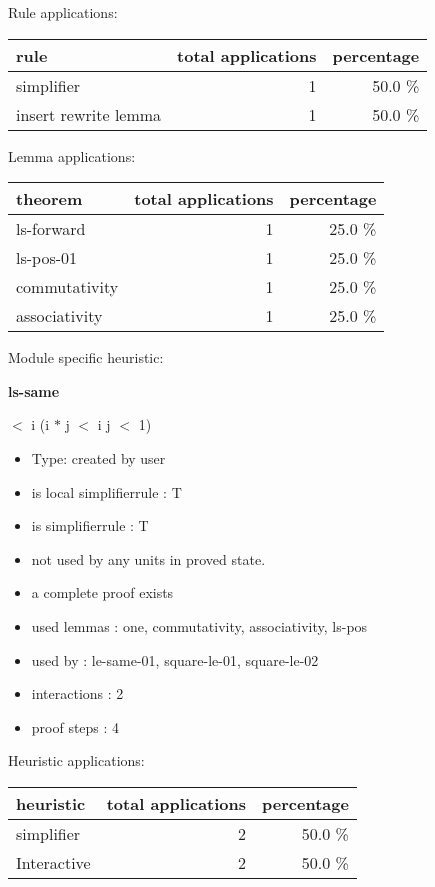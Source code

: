 \documentclass[a4paper]{article}
\begin{document}
Rule applications:

\begin{supertabular}{l|r|r}
rule	        & total applications & percentage \\ \hline
simplifier & 1 & 50.0 \% \\
insert rewrite lemma & 1 & 50.0 \% \\

\end{supertabular}

Lemma applications:

\begin{supertabular}{l|r|r}
theorem	        & total applications & percentage \\ \hline
ls-forward & 1 & 25.0 \% \\
ls-pos-01 & 1 & 25.0 \% \\
commutativity & 1 & 25.0 \% \\
associativity & 1 & 25.0 \% \\

\end{supertabular}

Module specific heuristic:

\pagebreak

{\LARGE\bf ls-same}\label{lemma-ls-same}

\medskip

  $<$ i \Imp (i $*$ j $<$ i \Equiv j $<$ 1)

\begin{itemize}

\item Type: created by user

\item is local simplifierrule : T
\item is simplifierrule : T
\item not used by any units in proved state.
\item       a complete proof exists
\item       used lemmas  : one, commutativity, associativity, ls-pos
\item       used by      : le-same-01, square-le-01, square-le-02
\item       interactions : 2
\item       proof steps  : 4
\end{itemize}

\medskip


Heuristic applications:

\begin{supertabular}{l|r|r}
heuristic	& total applications & percentage \\ \hline
simplifier & 2 & 50.0 \% \\
Interactive & 2 & 50.0 \% \\

\end{supertabular}
\end{document}

